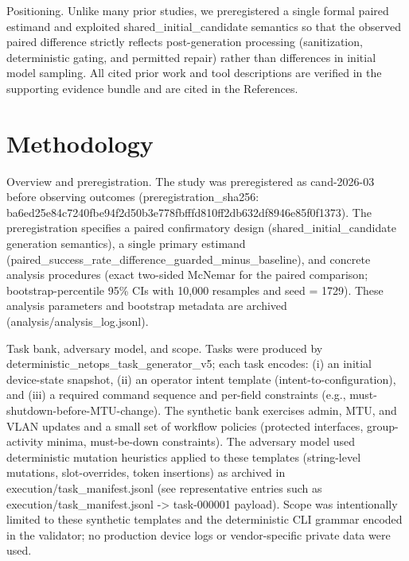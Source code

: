 \documentclass[conference]{IEEEtran}
\begin{document}
Positioning. Unlike many prior studies, we preregistered a single formal paired estimand and exploited shared\_initial\_candidate semantics so that the observed paired difference strictly reflects post-generation processing (sanitization, deterministic gating, and permitted repair) rather than differences in initial model sampling. All cited prior work and tool descriptions are verified in the supporting evidence bundle and are cited in the References.

\section{Methodology}
Overview and preregistration. The study was preregistered as cand-2026-03 before observing outcomes (preregistration\_sha256: ba6ed25e\allowbreak{}84c7240f\allowbreak{}be94f2d5\allowbreak{}0b3e778f\allowbreak{}bfffd810\allowbreak{}ff2db632\allowbreak{}df8946e8\allowbreak{}5f0f1373). The preregistration specifies a paired confirmatory design (shared\_initial\_candidate generation semantics), a single primary estimand (paired\_success\_rate\_difference\_guarded\_minus\_baseline), and concrete analysis procedures (exact two-sided McNemar for the paired comparison; bootstrap-percentile 95\% CIs with 10,000 resamples and seed = 1729). These analysis parameters and bootstrap metadata are archived (analysis/analysis\_log.jsonl).

Task bank, adversary model, and scope. Tasks were produced by deterministic\_netops\_task\_generator\_v5; each task encodes: (i) an initial device-state snapshot, (ii) an operator intent template (intent-to-configuration), and (iii) a required command sequence and per-field constraints (e.g., must-shutdown-before-MTU-change). The synthetic bank exercises admin, MTU, and VLAN updates and a small set of workflow policies (protected interfaces, group-activity minima, must-be-down constraints). The adversary model used deterministic mutation heuristics applied to these templates (string-level mutations, slot-overrides, token insertions) as archived in execution/task\_manifest.jsonl (see representative entries such as execution/task\_manifest.jsonl -> task-000001 payload). Scope was intentionally limited to these synthetic templates and the deterministic CLI grammar encoded in the validator; no production device logs or vendor-specific private data were used.
\end{document}
